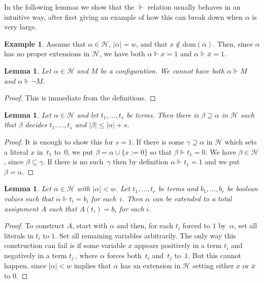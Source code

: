 \documentclass[11pt]{article}
\numberwithin{equation}{section}
\newtheorem{lemma}[theorem]{Lemma}
\theoremstyle{definition}
\newtheorem{example}[theorem]{Example}
\theoremstyle{plain}
\newcommand\calH{\mathcal{H}}
\begin{document}
In the following lemmas we show that the $\Vdash$ relation usually
behaves in an intuitive way, after first giving an example of how this can
break down when $\alpha$ is very large.

\begin{example}
Assume that $\alpha \in \calH$, $|\alpha| = w$, and that $x \notin \mathrm{dom}(\alpha)$.
Then, since $\alpha$ has no proper extensions in $\calH$,
we have both $\alpha \Vdash x = 1$ and $\alpha \Vdash \bar x = 1$. 
\end{example}

\begin{lemma}\label{lem:contrforce} 
Let $\alpha\in \calH$ and $M$ be a configuration. 
We cannot have both $\alpha\Vdash M$ and  $\alpha \Vdash \neg M$.
\end{lemma}

\begin{proof}
This is immediate from the definitions.
\end{proof}

\begin{lemma} \label{lem:extend_to_decide}
Let $\alpha \in \calH$ and let $t_1, \dots, t_s$ be terms.
Then there is  $\beta \supseteq \alpha$ in $\calH$ such that $\beta$ 
decides $t_1, \dots, t_s$ and $|\beta| \le |\alpha|+s$.
\end{lemma}

\begin{proof}
It is enough to show this for $s=1$.
If there is some $\gamma \supseteq \alpha$ in $\calH$ which sets a literal $x$ in~$t_1$
to~$0$, we put $\beta = \alpha \cup \{ x := 0 \}$ so that
$\beta \Vdash t_{1}=0$. We have $\beta \in \calH$, since $\beta \subseteq \gamma$.
If there is no such~$\gamma$ then by definition
$\alpha \Vdash t_1=1$ and we put $\beta = \alpha$.
\end{proof}

\begin{lemma} \label{lem:forcing_to_total_assignment}
Let $\alpha \in \calH$ with $|\alpha|<w$.
Let $t_1, \dots, t_r$ be terms and $b_1, \dots, b_r$
be boolean values such that $\alpha \Vdash t_i= b_i$ for each~$i$.
Then $\alpha$ can be extended to a total assignment $A$
such that $A(t_i) = b_i$ for each $i$.
\end{lemma}

\begin{proof}
To construct $A$, start with $\alpha$ and then, 
for each $t_i$ forced to $1$ by~$\alpha$, set all literals in $t_i$ to $1$. 
Set all remaining variables arbitrarily.
The only way this construction can fail is if some 
variable $x$ appears positively in a term $t_i$
and negatively in a term $t_j$\,, where $\alpha$ forces
both~$t_i$ and~$t_j$ to~$1$.
But this cannot happen, since $|\alpha|<w$ implies that $\alpha$
has an extension in $\calH$
setting either $x$ or $\bar x$ to $0$.
\end{proof}
\end{document}
